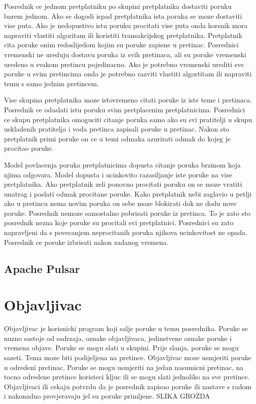 \documentclass[times, utf8, diplomski, numeric]{fer}
\begin{document}
Posrednik ce jednom pretplatniku po skupini pretplatnika dostaviti poruku barem jednom. Ako se dogodi ispad pretplatnika ista poruka se moze dostaviti vise puta. Ako je nedopustivo istu poruku procitati vise puta onda korsnik mora napraviti vlastiti algoritam ili koristiti transakcijskog pretplatnika. Pretplatnik cita poruke onim redoslijedom kojim su poruke zapisne u pretinac. Posrednici vremenski ne ureduju dostavu poruka iz svih pretinaca, ali su poruke vremenski uredeno u svakom pretincu pojedinacno. Ako je potrebno vremenski urediti sve poruke u svim pretincima onda je potrebno razviti vlastiti algortitam ili napraviti temu s samo jednim pretincem.

Vise skupina pretplatnika moze istovremeno citati poruke iz iste teme i pretinaca. Posrednik ce odaslati istu poruku svim pretplacenim pretplatnicima. Posrednici ce skupu pretplatnika omoguciti citanje poruka samo ako su svi pratitelji u skupu uskladenih pratitelja i voda pretinca zapisali poruke u pretinac. Nakon sto pretplatnik primi poruke on ce u temi odmaka azurirati odmak do kojeg je procitao poruke.

Model povlacenja poruka pretplatnicima dopusta citanje poruka brzinom koja njima odgovara. Model dopusta i ucinkovito razasiljanje iste poruke na vise pretplatnika. Ako pretplatnik zeli ponovno procitati poruku on se moze vratiti unatrag i poslati odmak procitane poruke. Kako pretplatnik nebi zaglavio u petlji ako u pretincu nema novim poruka on sebe moze blokirati dok ne dodu nove poruke. Posrednik nemoze samostalno pobrisati poruke iz pretinca. To je zato sto posrednik nezna koje poruke su procitali svi pretplatnici. Posrednici su zato napravljeni da s povecanjem neprocitanih poruka njihova ucinkovitost ne opada. Posrednik ce poruke izbrisati nakon zadanog vremena.



\section{Apache Pulsar}



\chapter{Objavljivac}
Objavljivac je korisnicki program koji salje poruke u temu posrednika. Poruke se nuzno sastoje od sadrzaja, oznake objavljivaca, jedinstvene oznake poruke i vremena objave. Poruke se mogu slati u skupini. Prije slanja, poruke se mogu sazeti. Tema moze biti podijeljena na pretince. Objavljivac moze usmjeriti poruke u odredeni pretinac. Poruke se mogu usmjeriti na jedan nasumicni pretinac, na tocno odredene pretince koristeci kljuc ili se mogu slati jednoliko na sve pretince. Objavljivaci ili cekaju potvrdu da je posrednik zapisao poruke ili nastave s radom i nakonadno provjeravaju jel su poruke primljene. 
SLIKA GROZDA
\end{document}
